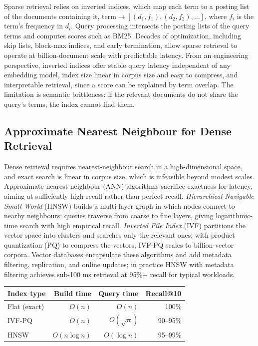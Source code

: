\documentclass[11pt]{book}
\begin{document}
Sparse retrieval relies on inverted indices, which map each term to a posting list of the documents containing it, $\text{term} \rightarrow [(d_1, f_1), (d_2, f_2), \ldots]$, where $f_i$ is the term's frequency in $d_i$. Query processing intersects the posting lists of the query terms and computes scores such as BM25. Decades of optimization, including skip lists, block-max indices, and early termination, allow sparse retrieval to operate at billion-document scale with predictable latency. From an engineering perspective, inverted indices offer stable query latency independent of any embedding model, index size linear in corpus size and easy to compress, and interpretable retrieval, since a score can be explained by term overlap. The limitation is semantic brittleness: if the relevant documents do not share the query's terms, the index cannot find them.

\subsection{Approximate Nearest Neighbour for Dense Retrieval}

Dense retrieval requires nearest-neighbour search in a high-dimensional space, and exact search is linear in corpus size, which is infeasible beyond modest scales. Approximate nearest-neighbour (ANN) algorithms sacrifice exactness for latency, aiming at sufficiently high recall rather than perfect recall. \textit{Hierarchical Navigable Small World} (HNSW) builds a multi-layer graph in which nodes connect to nearby neighbours; queries traverse from coarse to fine layers, giving logarithmic-time search with high empirical recall. \textit{Inverted File Index} (IVF) partitions the vector space into clusters and searches only the relevant ones; with product quantization (PQ) to compress the vectors, IVF-PQ scales to billion-vector corpora. Vector databases encapsulate these algorithms and add metadata filtering, replication, and online updates; in practice HNSW with metadata filtering achieves sub-100 ms retrieval at 95\%+ recall for typical workloads.

\begin{center}
\begin{tabular}{lrrr}
\toprule
Index type & Build time & Query time & Recall@10 \\
\midrule
Flat (exact) & $O(n)$ & $O(n)$ & 100\% \\
IVF-PQ & $O(n)$ & $O(\sqrt{n})$ & 90--95\% \\
HNSW & $O(n \log n)$ & $O(\log n)$ & 95--99\% \\
\bottomrule
\end{tabular}
\end{center}
\end{document}
